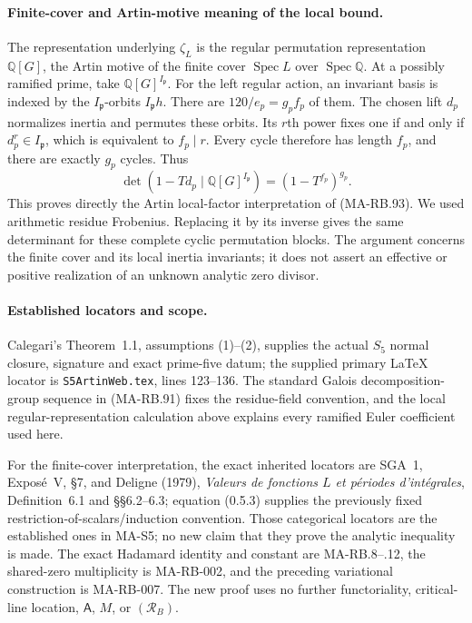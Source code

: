 \paragraph{Finite-cover and Artin-motive meaning of the local bound.}
The representation underlying \(\zeta_L\) is the regular
permutation representation \(\mathbb Q[G]\), the
Artin motive of the finite cover \(\operatorname{Spec}L\)
over \(\operatorname{Spec}\mathbb Q\).
At a possibly ramified prime, take
\(\mathbb Q[G]^{I_{\mathfrak p}}\).
For the left regular action, an invariant basis is
indexed by the \(I_{\mathfrak p}\)-orbits \(I_{\mathfrak p}h\).
There are \(120/e_p=g_pf_p\) of them.
The chosen lift \(d_p\) normalizes inertia and
permutes these orbits. Its \(r\)th power fixes
one if and only if \(d_p^r\in I_{\mathfrak p}\),
which is equivalent to \(f_p\mid r\).
Every cycle therefore has length \(f_p\),
and there are exactly \(g_p\) cycles. Thus
\[
 \det(1-Td_p\mid\mathbb Q[G]^{I_{\mathfrak p}})
                         =(1-T^{f_p})^{g_p}.
\]
This proves directly the Artin local-factor
interpretation of (MA-RB.93).
We used arithmetic residue Frobenius. Replacing
it by its inverse gives the same determinant
for these complete cyclic permutation blocks.
The argument concerns the finite cover and
its local inertia invariants; it does not
assert an effective or positive realization
of an unknown analytic zero divisor.

\paragraph{Established locators and scope.}
Calegari's Theorem~1.1, assumptions (1)--(2),
supplies the actual \(S_5\) normal closure,
signature and exact prime-five datum; the
supplied primary LaTeX locator is
\texttt{S5ArtinWeb.tex}, lines 123--136.
The standard Galois decomposition-group
sequence in (MA-RB.91) fixes the residue-field
convention, and the local regular-representation
calculation above explains every ramified
Euler coefficient used here.

For the finite-cover interpretation, the exact
inherited locators are SGA~1, Expos\'e~V, \S7,
and Deligne (1979), \emph{Valeurs de fonctions
\(L\) et p\'eriodes d'int\'egrales},
Definition~6.1 and \S\S6.2--6.3; equation
(0.5.3) supplies the previously fixed
restriction-of-scalars/induction convention.
Those categorical locators are the established
ones in MA-S5; no new claim that they prove
the analytic inequality is made.
The exact Hadamard identity and constant are
MA-RB.8--.12, the shared-zero multiplicity is
MA-RB-002, and the preceding variational
construction is MA-RB-007. The new proof uses
no further functoriality, critical-line
location, \(\mathsf A\), \(M\), or
\((\mathcal R_B)\).
